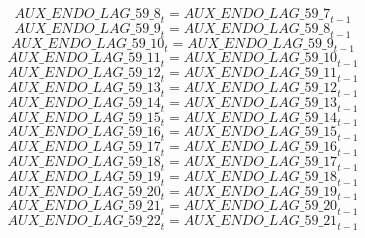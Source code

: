 \begin{dmath}
{AUX\_ENDO\_LAG\_59\_8}_{t}={AUX\_ENDO\_LAG\_59\_7}_{t-1}
\end{dmath}
\begin{dmath}
{AUX\_ENDO\_LAG\_59\_9}_{t}={AUX\_ENDO\_LAG\_59\_8}_{t-1}
\end{dmath}
\begin{dmath}
{AUX\_ENDO\_LAG\_59\_10}_{t}={AUX\_ENDO\_LAG\_59\_9}_{t-1}
\end{dmath}
\begin{dmath}
{AUX\_ENDO\_LAG\_59\_11}_{t}={AUX\_ENDO\_LAG\_59\_10}_{t-1}
\end{dmath}
\begin{dmath}
{AUX\_ENDO\_LAG\_59\_12}_{t}={AUX\_ENDO\_LAG\_59\_11}_{t-1}
\end{dmath}
\begin{dmath}
{AUX\_ENDO\_LAG\_59\_13}_{t}={AUX\_ENDO\_LAG\_59\_12}_{t-1}
\end{dmath}
\begin{dmath}
{AUX\_ENDO\_LAG\_59\_14}_{t}={AUX\_ENDO\_LAG\_59\_13}_{t-1}
\end{dmath}
\begin{dmath}
{AUX\_ENDO\_LAG\_59\_15}_{t}={AUX\_ENDO\_LAG\_59\_14}_{t-1}
\end{dmath}
\begin{dmath}
{AUX\_ENDO\_LAG\_59\_16}_{t}={AUX\_ENDO\_LAG\_59\_15}_{t-1}
\end{dmath}
\begin{dmath}
{AUX\_ENDO\_LAG\_59\_17}_{t}={AUX\_ENDO\_LAG\_59\_16}_{t-1}
\end{dmath}
\begin{dmath}
{AUX\_ENDO\_LAG\_59\_18}_{t}={AUX\_ENDO\_LAG\_59\_17}_{t-1}
\end{dmath}
\begin{dmath}
{AUX\_ENDO\_LAG\_59\_19}_{t}={AUX\_ENDO\_LAG\_59\_18}_{t-1}
\end{dmath}
\begin{dmath}
{AUX\_ENDO\_LAG\_59\_20}_{t}={AUX\_ENDO\_LAG\_59\_19}_{t-1}
\end{dmath}
\begin{dmath}
{AUX\_ENDO\_LAG\_59\_21}_{t}={AUX\_ENDO\_LAG\_59\_20}_{t-1}
\end{dmath}
\begin{dmath}
{AUX\_ENDO\_LAG\_59\_22}_{t}={AUX\_ENDO\_LAG\_59\_21}_{t-1}
\end{dmath}
